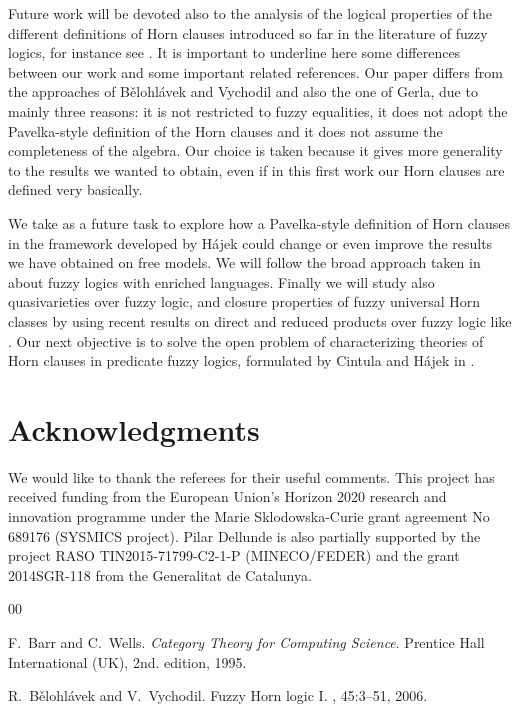 \documentclass{IOS-Book-Article}
\begin{document}
{Future work will be devoted also to the analysis of the logical properties of the different definitions of Horn clauses introduced so far in the literature of fuzzy logics, for instance see \cite{BeVic06, BeVic06b, Ma99}. It is important to underline here some differences between our work and some important related references. Our paper differs from the approaches of B\v{e}lohl\'avek and Vychodil and also the one of Gerla, due to mainly three reasons: it is not restricted to fuzzy equalities, it does not adopt the Pavelka-style definition of the Horn clauses and it does not assume the completeness of the algebra. Our choice is taken because it gives more generality to the results we wanted to obtain, even if in this first work our Horn clauses are defined very basically. 


We take as a future task to explore how a Pavelka-style definition of Horn clauses in the framework developed by H\'ajek \cite{Ha98} could change or even improve the results we have obtained on free models. We will follow the broad approach taken in \cite[Ch.8]{CiHaNo11} about fuzzy logics with enriched languages. Finally we will study also quasivarieties over fuzzy logic, and closure properties of fuzzy universal Horn classes by using recent results on direct and reduced products over fuzzy logic like \cite{De12}. Our next objective is to solve the open problem  of characterizing theories of Horn clauses in predicate fuzzy logics, formulated by Cintula and H\'ajek in \cite{CiHa10}.


    
    \section*{Acknowledgments} We would like to thank the referees for their useful comments. This project has received funding from the European Union's Horizon 2020 research and innovation programme under the Marie Sklodowska-Curie grant agreement No 689176 (SYSMICS project). Pilar Dellunde is also partially supported by the project RASO TIN2015-71799-C2-1-P (MINECO/FEDER) and the grant 2014SGR-118 from the Generalitat de Catalunya.         
        

\begin{thebibliography}{00}


F.~Barr and C.~Wells. 
\newblock \emph{Category Theory for Computing Science}.
\newblock Prentice Hall International (UK), 2nd. edition, 1995.


R.~B\v{e}lohl\'avek and V.~Vychodil. 
\newblock Fuzzy Horn logic I.
, 45:3--51, 
2006.



\end{thebibliography}}
\end{document}
